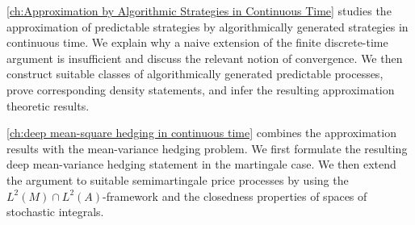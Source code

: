\documentclass[11pt,a4paper,twoside,openany]{report}
\theoremstyle{plain} %
\theoremstyle{definition} %
\theoremstyle{remark} %
\begin{document}
\cref{ch:Approximation by Algorithmic Strategies in Continuous Time} studies the approximation of
predictable strategies by algorithmically generated strategies in continuous time. We explain
why a naive extension of the finite discrete-time argument is insufficient and discuss the relevant notion of convergence. We then construct suitable
classes of algorithmically generated predictable processes, prove corresponding density statements, and infer the resulting approximation theoretic results. 

\cref{ch:deep mean-square hedging in continuous time} combines the approximation
results with the mean-variance hedging problem. We first formulate the resulting deep
mean-variance hedging statement in the martingale case. We then extend the argument to
suitable semimartingale price processes by using the \(L^2(M)\cap L^2(A)\)-framework and
the closedness properties of spaces of stochastic integrals.
\end{document}
